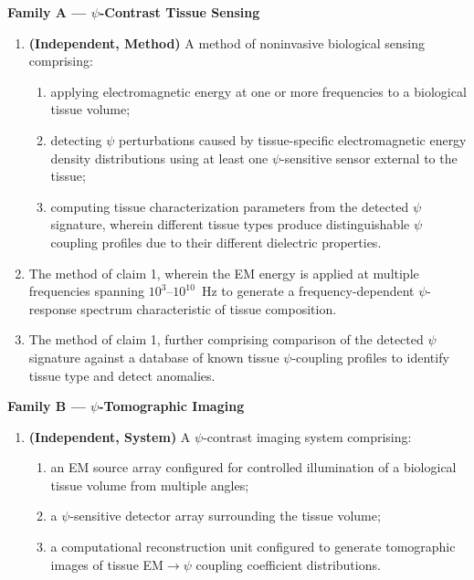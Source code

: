 \documentclass[12pt,letterpaper]{article}
\begin{document}
\begin{tcolorbox}[colback=blue!5!white, colframe=blue!50!black,
title=Patent \#18 -- Proposed Claims]

\textbf{Family A --- $\psi$-Contrast Tissue Sensing}
\begin{enumerate}
\item \textbf{(Independent, Method)} A method of noninvasive biological
sensing comprising:
\begin{enumerate}[label=(\alph*)]
\item applying electromagnetic energy at one or more frequencies to a
biological tissue volume;
\item detecting $\psi$ perturbations caused by tissue-specific
electromagnetic energy density distributions using at least one
$\psi$-sensitive sensor external to the tissue;
\item computing tissue characterization parameters from the detected
$\psi$ signature, wherein different tissue types produce
distinguishable $\psi$ coupling profiles due to their different
dielectric properties.
\end{enumerate}

\item The method of claim 1, wherein the EM energy is applied at
multiple frequencies spanning $10^3$--$10^{10}$~Hz to generate a
frequency-dependent $\psi$-response spectrum characteristic of tissue
composition.

\item The method of claim 1, further comprising comparison of the
detected $\psi$ signature against a database of known tissue $\psi$-coupling
profiles to identify tissue type and detect anomalies.
\end{enumerate}

\textbf{Family B --- $\psi$-Tomographic Imaging}
\begin{enumerate}[resume]
\item \textbf{(Independent, System)} A $\psi$-contrast imaging system
comprising:
\begin{enumerate}[label=(\alph*)]
\item an EM source array configured for controlled illumination of a
biological tissue volume from multiple angles;
\item a $\psi$-sensitive detector array surrounding the tissue volume;
\item a computational reconstruction unit configured to generate
tomographic images of tissue EM$\to\psi$ coupling coefficient
distributions.
\end{enumerate}


\end{enumerate}
\end{tcolorbox}
\end{document}
